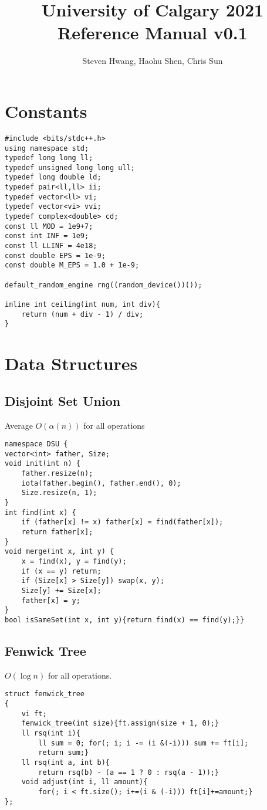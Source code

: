 \documentclass[10pt]{article}{\twocolumn}
\author{Steven Hwang, Haohu Shen, Chris Sun}
\title{University of Calgary 2021 Reference Manual v0.1}
\date{\vspace{-5ex}}
\begin{document}
\maketitle
\tableofcontents
\newpage
\section{Constants}
\renewcommand{\ttdefault}{pcr}
\begin{lstlisting}
#include <bits/stdc++.h>
using namespace std;
typedef long long ll;
typedef unsigned long long ull;
typedef long double ld;
typedef pair<ll,ll> ii;
typedef vector<ll> vi;
typedef vector<vi> vvi;
typedef complex<double> cd;
const ll MOD = 1e9+7;
const int INF = 1e9;
const ll LLINF = 4e18;
const double EPS = 1e-9;
const double M_EPS = 1.0 + 1e-9;

default_random_engine rng((random_device())());

inline int ceiling(int num, int div){
    return (num + div - 1) / div;
}
\end{lstlisting}


\section{Data Structures}

\subsection{Disjoint Set Union}
Average $O(\alpha(n))$ for all operations
\begin{lstlisting}
namespace DSU {
vector<int> father, Size;
void init(int n) {
    father.resize(n);
    iota(father.begin(), father.end(), 0);
    Size.resize(n, 1);
}
int find(int x) {
    if (father[x] != x) father[x] = find(father[x]);
    return father[x];
}
void merge(int x, int y) {
    x = find(x), y = find(y);
    if (x == y) return;
    if (Size[x] > Size[y]) swap(x, y);
    Size[y] += Size[x];
    father[x] = y;
}
bool isSameSet(int x, int y){return find(x) == find(y);}}
\end{lstlisting}

\subsection{Fenwick Tree}
$O(\log{n})$ for all operations.
\begin{lstlisting}
struct fenwick_tree
{
    vi ft;
    fenwick_tree(int size){ft.assign(size + 1, 0);}
    ll rsq(int i){
        ll sum = 0; for(; i; i -= (i &(-i))) sum += ft[i];
        return sum;}
    ll rsq(int a, int b){
        return rsq(b) - (a == 1 ? 0 : rsq(a - 1));}
    void adjust(int i, ll amount){
        for(; i < ft.size(); i+=(i & (-i))) ft[i]+=amount;}
};
\end{lstlisting}
\end{document}
